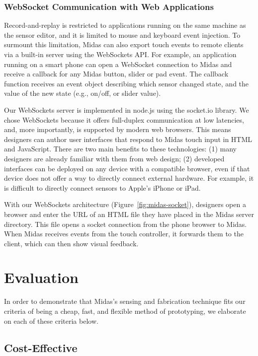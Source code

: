 \subsubsection{WebSocket Communication with Web Applications}

Record-and-replay is restricted to applications running on the same machine as the sensor editor, and it is limited to mouse and keyboard event injection. To surmount this limitation, Midas can also export touch events to remote clients via a built-in server using the WebSockets API. For example, an application running on a smart phone can open a WebSocket connection to Midas and receive a callback for any Midas button, slider or pad event. The callback function receives an event object describing which sensor changed state, and the value of the new state (e.g., on/off, or slider value).

Our WebSockets server is implemented in node.js using the socket.io library. We chose WebSockets because it offers full-duplex communication at low latencies, and, more importantly, is supported by modern web browsers. This means designers can author user interfaces that respond to Midas touch input in HTML and JavaScript. There are two main benefits to these technologies: (1) many designers are already familiar with them from web design; (2) developed interfaces can be deployed on any device with a compatible browser, even if that device does not offer a way to directly connect external hardware. For example, it is difficult to directly connect sensors to Apple's iPhone or iPad.

With our WebSockets architecture (Figure~\ref{fig:midas-socket}), designers open a browser and enter the URL of an HTML file they have placed in the Midas server directory. This file opens a socket connection from the phone browser to Midas. When Midas receives events from the touch controller, it forwards them to the client, which can then show visual feedback.


\section{Evaluation}

    In order to demonstrate that Midas's sensing and fabrication technique fits our criteria of being a cheap, fast, and flexible method of prototyping, we elaborate on each of these criteria below.

    \subsection{Cost-Effective}
    
